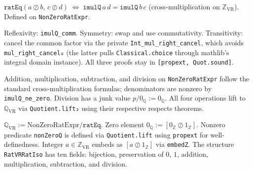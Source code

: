\begin{definition}
\label{def:ratEq}
\leanok
{}
$\texttt{ratEq}(a \oslash b,\, c \oslash d) \;\Longleftrightarrow\;
\texttt{imulQ}\,a\,d = \texttt{imulQ}\,b\,c$
(cross-multiplication on $\mathbb{Z}_{\mathrm{VR}}$).
Defined on \texttt{NonZeroRatExpr}.
\end{definition}

\begin{theorem}
\label{thm:ratEq_equiv}
\leanok
{}
Reflexivity: \texttt{imulQ\_comm}.  Symmetry: swap and use commutativity.
Transitivity: cancel the common factor via the private
\texttt{Int\_mul\_right\_cancel}, which avoids \texttt{mul\_right\_cancel₀}
(the latter pulls \texttt{Classical.choice} through mathlib's integral domain
instance).  All three proofs stay in \texttt{[propext, Quot.sound]}.
\end{theorem}

\begin{definition}
\label{def:rat_ops}
\leanok
{}
Addition, multiplication, subtraction, and division on \texttt{NonZeroRatExpr}
follow the standard cross-multiplication formulas; denominators are nonzero by
\texttt{imulQ\_ne\_zero}.  Division has a junk value $p / 0_{\mathbb{Q}} := 0_{\mathbb{Q}}$.
All four operations lift to $\mathbb{Q}_{\mathrm{VR}}$ via
\texttt{Quotient.lift₂} using their respective respects theorems.
\end{definition}

\begin{definition}
\label{def:RatVR}
\leanok
{}
$\mathbb{Q}_{\mathrm{VR}} := \mathrm{NonZeroRatExpr} / \texttt{ratEq}$.
Zero element $0_{\mathbb{Q}} := [0_{\mathbb{Z}} \oslash 1_{\mathbb{Z}}]$.
Nonzero predicate \texttt{nonZeroQ} is defined via \texttt{Quotient.lift}
using \texttt{propext} for well-definedness.
Integer $a \in \mathbb{Z}_{\mathrm{VR}}$ embeds as $[a \oslash 1_{\mathbb{Z}}]$
via \texttt{embedZ}.
The structure \texttt{RatVRRatIso} has ten fields:
bijection, preservation of $0$, $1$, addition, multiplication, subtraction,
and division.
\end{definition}

